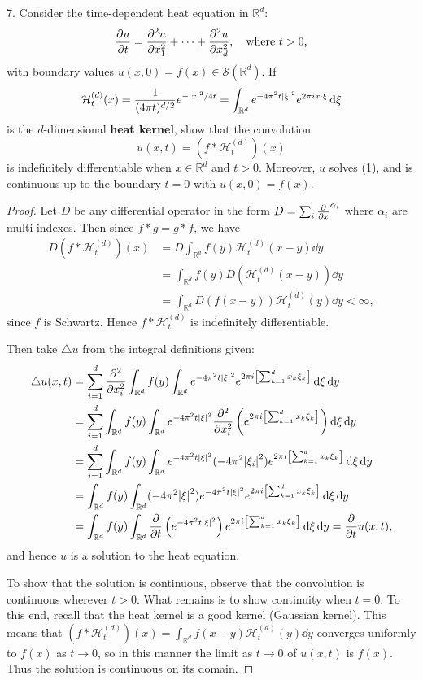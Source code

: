 \documentclass[11pt]{article}
\newcommand{\br}[1]{\left(#1\right)}
\newcommand{\sbr}[1]{\left[#1\right]}
\begin{document}
7. Consider the time-dependent heat equation in $\mathbb{R}^d$: \begin{equation}
  \pdv{u}{t} = \pdv[2]{u}{x_1} + \cdots + \pdv[2]{u}{x_d}, \quad \text{where $t>0$,}
\end{equation} with boundary values $u(x,0) = f(x)\in \mathcal{S}(\mathbb{R}^d)$. If \[\mathcal{H}_t^{(d)}(x) = \frac{1}{(4\pi t)^{d/2}}e^{-\abs{x}^2/4t} = \int_{\mathbb{R}^d}e^{-4\pi^2t\abs{\xi}^2}e^{2\pi i x\cdot \xi}\dd{\xi}\] is the $d$-dimensional \textbf{heat kernel}, show that the convolution \[u(x,t) = (f\ast \mathcal{H}_t^{(d)})(x)\] is indefinitely differentiable when $x\in\mathbb{R}^d$ and $t>0$. Moreover, $u$ solves (1), and is continuous up to the boundary $t=0$ with $u(x,0) = f(x)$.
\begin{proof}
  Let $D$ be any differential operator in the form $D = \sum_i\pdv{x}^{\alpha_i}$ where $\alpha_i$ are multi-indexes. Then since $f\ast g = g\ast f$, we have \begin{align*}
    D(f\ast \mathcal{H}_t^{(d)})(x) &= D\int_{\mathbb{R}^d} f(y) \mathcal{H}_t^{(d)}(x-y)\dd{y}\\
    &= \int_{\mathbb{R}^d} f(y) D(\mathcal{H}_t^{(d)}(x-y))\dd{y}\\
    &= \int_{\mathbb{R}^d} D(f(x-y)) \mathcal{H}_t^{(d)}(y)\dd{y} < \infty,
  \end{align*} since $f$ is Schwartz. Hence $f\ast\mathcal{H}_t^{(d)}$ is indefinitely differentiable.

  Then take $\triangle u$ from the integral definitions given: \begin{align*}
    \triangle u(x,t) &= \sum_{i=1}^d \pdv[2]{x_i} \int_{\mathbb{R}^d} f(y) \int_{\mathbb{R}^d}e^{-4\pi^2t\abs{\xi}^2}e^{2\pi i \sbr{\sum_{k=1}^dx_k\xi_k}}\dd{\xi}\dd{y}\\
    &= \sum_{i=1}^d \int_{\mathbb{R}^d} f(y) \int_{\mathbb{R}^d}e^{-4\pi^2t\abs{\xi}^2}\pdv[2]{x_i}\br{e^{2\pi i \sbr{\sum_{k=1}^dx_k\xi_k}}}\dd{\xi}\dd{y}\\
    &= \sum_{i=1}^d \int_{\mathbb{R}^d} f(y) \int_{\mathbb{R}^d}e^{-4\pi^2t\abs{\xi}^2}(-4\pi^2\abs{\xi_i}^2)e^{2\pi i \sbr{\sum_{k=1}^dx_k\xi_k}}\dd{\xi}\dd{y}\\
    &= \int_{\mathbb{R}^d} f(y) \int_{\mathbb{R}^d}(-4\pi^2\abs{\xi}^2)e^{-4\pi^2t\abs{\xi}^2}e^{2\pi i \sbr{\sum_{k=1}^dx_k\xi_k}}\dd{\xi}\dd{y}\\
    &= \int_{\mathbb{R}^d} f(y) \int_{\mathbb{R}^d}\pdv{t}\br{e^{-4\pi^2t\abs{\xi}^2}}e^{2\pi i \sbr{\sum_{k=1}^dx_k\xi_k}}\dd{\xi}\dd{y} = \pdv{t} u(x,t),
  \end{align*} and hence $u$ is a solution to the heat equation.

  To show that the solution is continuous, observe that the convolution is continuous wherever $t>0$. What remains is to show continuity when $t=0$. To this end, recall that the heat kernel is a good kernel (Gaussian kernel). This means that $(f\ast \mathcal{H}_t^{(d)})(x) = \int_{\mathbb{R}^d} f(x-y)\mathcal{H}_t^{(d)}(y)\dd{y}$ converges uniformly to $f(x)$ as $t\to 0$, so in this manner the limit as $t\to 0$ of $u(x,t)$ is $f(x)$. Thus the solution is continuous on its domain.
\end{proof}
\end{document}
